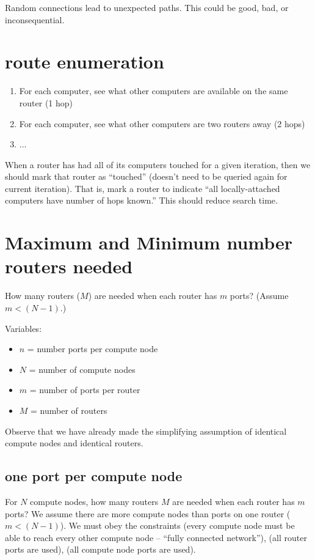 \documentclass[pdftex]{article}
\begin{document}
Random connections lead to unexpected paths. This could be good, bad, or inconsequential.

\section{route enumeration}

\begin{enumerate}
 \item For each computer, see what other computers are available on the same router (1 hop)
 \item For each computer, see what other computers are two routers away (2 hops)
 \item ...
\end{enumerate}
When a router has had all of its computers touched for a given iteration, then we should mark that router as ``touched'' (doesn't need to be queried again for current iteration). That is, mark a router to indicate ``all locally-attached computers have number of hops known.'' This should reduce search time.

\section{Maximum and Minimum number routers needed}
How many routers ($M$) are needed when each router has $m$ ports? (Assume $m<(N-1)$.)

Variables: 
\begin{itemize}
 \item $n$ = number ports per compute node
 \item $N$ = number of compute nodes
\item $m$ = number of ports per router
 \item $M$ = number of routers
\end{itemize}
Observe that we have already made the simplifying assumption of identical compute nodes and identical routers.

\subsection{one port per compute node}
For $N$ compute nodes, how many routers $M$ are needed when each router has $m$ ports? We assume there are more compute nodes than ports on one router ($m<(N-1)$). We must obey the constraints (every compute node must be able to reach every other compute node -- ``fully connected network''), (all router ports are used), (all compute node ports are used).
\end{document}
